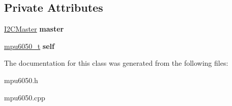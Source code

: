 \subsection*{Private Attributes}
\begin{DoxyCompactItemize}
\item 
\mbox{\label{classMpu6050_a268012468e495b0888a659dc0458a72c}} 
\mbox{\hyperlink{classI2CMaster}{I2\+C\+Master}} {\bfseries master}
\item 
\mbox{\label{classMpu6050_a53fb7f46e549c2fc2a40a3fcca31825f}} 
\mbox{\hyperlink{structmpu6050__t}{mpu6050\+\_\+t}} {\bfseries self}
\end{DoxyCompactItemize}


The documentation for this class was generated from the following files\+:\begin{DoxyCompactItemize}
\item 
mpu6050.\+h\item 
mpu6050.\+cpp\end{DoxyCompactItemize}
